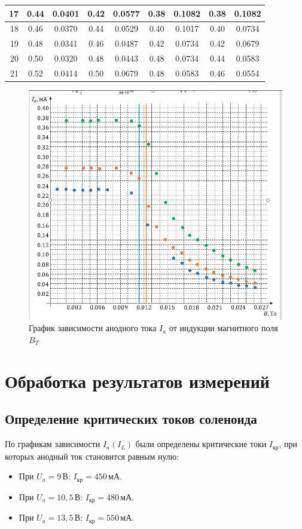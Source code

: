 \documentclass[14pt]{extarticle}
\begin{document}
\begin{table}[ht]
\begin{tabular}{|r|c|c|c|c|c|c|c|c|}
        17 & 0.44 & 0.0401 & 0.42 & 0.0577 & 0.38 & 0.1082 & 0.38 & 0.1082 \\ \hline
        18 & 0.46 & 0.0370 & 0.44 & 0.0529 & 0.40 & 0.1017 & 0.40 & 0.0734 \\ \hline
        19 & 0.48 & 0.0341 & 0.46 & 0.0487 & 0.42 & 0.0734 & 0.42 & 0.0679 \\ \hline
        20 & 0.50 & 0.0320 & 0.48 & 0.0443 & 0.48 & 0.0734 & 0.44 & 0.0583 \\ \hline
        21 & 0.52 & 0.0414 & 0.50 & 0.0679 & 0.48 & 0.0583 & 0.46 & 0.0554 \\ \hline
    \end{tabular}
\end{table}

\begin{figure}[H]
    \centering
    \includegraphics[width=0.7\linewidth]{grapgic.png}
    \caption{График зависимости анодного тока $I_a$ от индукции магнитного поля $B_T$}
\end{figure}

\section{Обработка результатов измерений}

\subsection{Определение критических токов соленоида}

По графикам зависимости $I_a(I_L)$ были определены критические токи $I_{\text{кр}}$, при которых анодный ток становится равным нулю:

\begin{itemize}
    \item При $U_a = 9\,\text{В}$: $I_{\text{кр}} = 450\,\text{мА}$.
    \item При $U_a = 10{,}5\,\text{В}$: $I_{\text{кр}} = 480\,\text{мА}$.
    \item При $U_a = 13{,}5\,\text{В}$: $I_{\text{кр}} = 550\,\text{мА}$.
\end{itemize}
\end{document}
